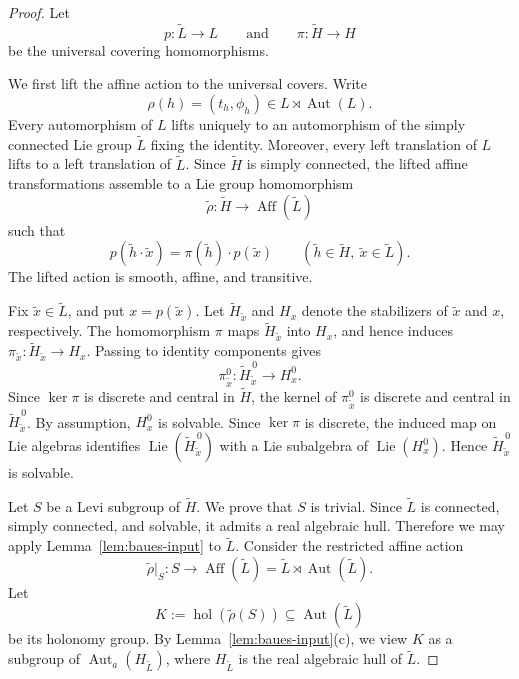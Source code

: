 \documentclass[reqno]{amsart}
\numberwithin{equation}{section}
\theoremstyle{definition}
\theoremstyle{remark}
\DeclareMathOperator{\Aut}{Aut}
\DeclareMathOperator{\Aff}{Aff}
\DeclareMathOperator{\Lie}{Lie}
\begin{document}
\begin{proof}
Let
\[
p\colon \widetilde L\to L
\qquad\text{and}\qquad
\pi\colon \widetilde H\to H
\]
be the universal covering homomorphisms.

We first lift the affine action to the universal covers. Write
\[
\rho(h)=(t_h,\phi_h)\in L\rtimes \Aut(L).
\]
Every automorphism of \(L\) lifts uniquely to an automorphism of the simply
connected Lie group \(\widetilde L\) fixing the identity. Moreover, every left
translation of \(L\) lifts to a left translation of \(\widetilde L\). Since
\(\widetilde H\) is simply connected, the lifted affine transformations assemble
to a Lie group homomorphism
\[
\widetilde\rho\colon \widetilde H\longrightarrow \Aff(\widetilde L)
\]
such that
\[
p(\widetilde h\cdot \widetilde x)
=
\pi(\widetilde h)\cdot p(\widetilde x)
\qquad
(\widetilde h\in\widetilde H,\ \widetilde x\in\widetilde L).
\]
The lifted action is smooth, affine, and transitive.

Fix \(\widetilde x\in \widetilde L\), and put \(x=p(\widetilde x)\). Let
\(\widetilde H_{\widetilde x}\) and \(H_x\) denote the stabilizers of
\(\widetilde x\) and \(x\), respectively. The homomorphism \(\pi\) maps
\(\widetilde H_{\widetilde x}\) into \(H_x\), and hence induces
$\pi_{\widetilde x}\colon
\widetilde H_{\widetilde x}\longrightarrow H_x$.
Passing to identity components gives
\[
\pi_{\widetilde x}^0\colon
\widetilde H_{\widetilde x}^{\,0}
\longrightarrow
H_x^0.
\]
Since \(\ker\pi\) is discrete and central in \(\widetilde H\), the kernel of
\(\pi_{\widetilde x}^0\) is discrete and central in
\(\widetilde H_{\widetilde x}^{\,0}\). 
By assumption, $H_x^0$ is solvable. Since $\ker\pi$ is discrete, the induced
map on Lie algebras identifies
$\Lie(\widetilde H_{\widetilde x}^{\,0})$
with a Lie subalgebra of $\Lie(H_x^0)$. Hence
$\widetilde H_{\widetilde x}^{\,0}$ is solvable.


Let \(S\) be a Levi subgroup of \(\widetilde H\). We prove that \(S\) is
trivial. Since \(\widetilde L\) is connected, simply connected, and solvable,
it admits a real algebraic hull. Therefore we may apply
Lemma~\ref{lem:baues-input} to \(\widetilde L\).
Consider the restricted affine action
\[
\widetilde\rho|_S\colon S\longrightarrow \Aff(\widetilde L)
=
\widetilde L\rtimes \Aut(\widetilde L).
\]
Let
\[
K:=\operatorname{hol}(\widetilde\rho(S))
\subseteq \Aut(\widetilde L)
\]
be its holonomy group. By Lemma~\ref{lem:baues-input}\textup{(c)}, we view
\(K\) as a subgroup of \(\Aut_a(H_{\widetilde L})\), where
\(H_{\widetilde L}\) is the real algebraic hull of \(\widetilde L\).


\end{proof}
\end{document}
